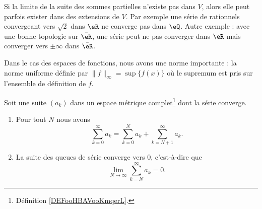 \begin{remark}
	Si la limite de la suite des sommes partielles n'existe pas dans \( V\), alors elle peut parfois exister dans des extensions de \( V\). Par exemple une série de rationnels convergeant vers \( \sqrt{2}\) dans \( \eR\) ne converge pas dans \( \eQ\). Autre exemple : avec une bonne topologie sur \( \bar \eR\), une série peut ne pas converger dans \( \eR\) mais converger vers \( \pm\infty\) dans \( \bar \eR\).
\end{remark}

Dans le cas des espaces de fonctions, nous avons une norme importante : la norme uniforme définie par \( \| f \|_{\infty}=\sup\{ f(x) \}\) où le supremum est pris sur l'ensemble de définition de \( f\).

\begin{lemma}       \label{LEMooHUZEooSyPipb}
	Soit une suite \( (a_k)\) dans un espace métrique complet\footnote{Définition \ref{DEFooHBAVooKmqerL}.} dont la série converge.

	\begin{enumerate}
		\item       \label{ITEMooPFSQooDhKFGL}
		      Pour tout \( N\) nous avons
		      \begin{equation}
			      \sum_{k=0}^{\infty}a_k=\sum_{k=0}^Na_k+\sum_{k=N+1}^{\infty}a_k.
		      \end{equation}
		\item       \label{ITEMooQNHMooUPjupB}
		      La suite des queues de série converge vers \( 0\), c'est-à-dire que
		      \begin{equation}
			      \lim_{N\to \infty} \sum_{k=N}^{\infty}a_k=0.
		      \end{equation}
	\end{enumerate}
\end{lemma}

